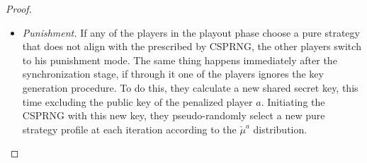 \begin{proof}[Proof]
\begin{itemize}
		\item \emph{Punishment.} If any of the players in the playout phase choose a pure strategy that does not align with the prescribed by CSPRNG, the other players switch to his punishment mode. The same thing happens immediately after the synchronization stage, if through it one of the players ignores the key generation procedure. To do this, they calculate a new shared secret key, this time excluding the public key of the penalized player $a$. Initiating the CSPRNG with this new key, they pseudo-randomly select a new pure strategy profile at each iteration according to the $\check{\mu}^{a}$ distribution. %
	\end{itemize}


\end{proof}
